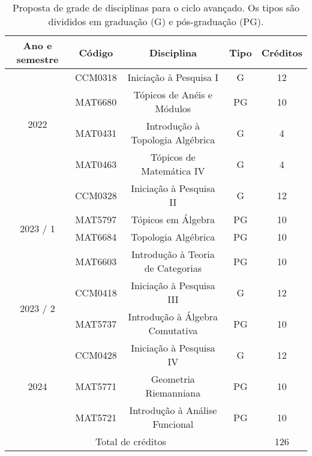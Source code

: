 \documentclass[11pt,reqno]{amsart}
\theoremstyle{definition}
\begin{document}
\begin{table}[h!]\label{tab:disc}
  \centering
  \caption{Proposta de grade de disciplinas para o ciclo avançado. Os tipos são
    divididos em graduação (G) e pós-graduação (PG).}
  \begin{tabular}{ |c|c|c|c|c| }
    \hline
    Ano e semestre & Código & Disciplina & Tipo & Créditos \\
    \hline

    \multirow{4}{*}{2022} & CCM0318 & Iniciação à Pesquisa I & G & 12 \\
                   & MAT6680 &Tópicos de Anéis e Módulos & PG & 10 \\
                   & MAT0431 & Introdução à Topologia Algébrica & G & 4 \\
                   & MAT0463 & Tópicos de Matemática IV & G & 4 \\
    \hline

    \multirow{4}{*}{2023 / 1} & CCM0328 & Iniciação à Pesquisa II & G & 12 \\
                   & MAT5797  & Tópicos em Álgebra & PG & 10 \\
                   & MAT6684 & Topologia Algébrica & PG & 10 \\
                   & MAT6603 & Introdução à Teoria de Categorias & PG & 10 \\
    \hline

    \multirow{2}{*}{2023 / 2} & CCM0418 & Iniciação à Pesquisa III & G & 12 \\
                   & MAT5737  & Introdução à Álgebra Comutativa & PG & 10 \\
    \hline

    \multirow{3}{*}{2024} & CCM0428 & Iniciação à Pesquisa IV & G & 12 \\
                   & MAT5771 & Geometria Riemanniana & PG & 10 \\
                   & MAT5721 & Introdução à Análise Funcional & PG & 10 \\
    \hline

    \multicolumn{4}{|c|}{Total de créditos} & 126 \\
    \hline
\end{tabular}
\end{table}
\end{document}
